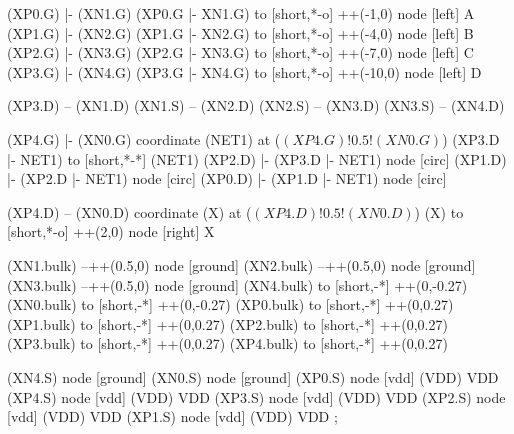 \begin{circuitikz}[american]

	(XP0.G) |- (XN1.G)
	(XP0.G |- XN1.G) to [short,*-o] ++(-1,0) node [left] {A}	
	(XP1.G) |- (XN2.G)
	(XP1.G |- XN2.G) to [short,*-o] ++(-4,0) node [left] {B}
	(XP2.G) |- (XN3.G)
	(XP2.G |- XN3.G) to [short,*-o] ++(-7,0) node [left] {C}
	(XP3.G) |- (XN4.G)
	(XP3.G |- XN4.G) to [short,*-o] ++(-10,0) node [left] {D}
	
	(XP3.D) -- (XN1.D)
	(XN1.S) -- (XN2.D)
	(XN2.S) -- (XN3.D)
	(XN3.S) -- (XN4.D)
	
	(XP4.G) |- (XN0.G)
	coordinate (NET1) at ($(XP4.G)!0.5!(XN0.G)$)
	(XP3.D |- NET1) to [short,*-*] (NET1) 
	(XP2.D) |- (XP3.D |- NET1) node [circ]{}
	(XP1.D) |- (XP2.D |- NET1) node [circ]{}
	(XP0.D) |- (XP1.D |- NET1) node [circ]{}
	
	(XP4.D) -- (XN0.D)
	coordinate (X) at ($(XP4.D)!0.5!(XN0.D)$)
	(X) to [short,*-o] ++(2,0) node [right] {X}
	
	(XN1.bulk) --++(0.5,0) node [ground]{}	
	(XN2.bulk) --++(0.5,0) node [ground]{}
	(XN3.bulk) --++(0.5,0) node [ground]{}
	(XN4.bulk) to [short,-*] ++(0,-0.27)
	(XN0.bulk) to [short,-*] ++(0,-0.27)
	(XP0.bulk) to [short,-*] ++(0,0.27)
	(XP1.bulk) to [short,-*] ++(0,0.27)
	(XP2.bulk) to [short,-*] ++(0,0.27)
	(XP3.bulk) to [short,-*] ++(0,0.27)
	(XP4.bulk) to [short,-*] ++(0,0.27)


	(XN4.S) node [ground] {}
	(XN0.S) node [ground] {}
	(XP0.S) node [vdd] (VDD) {VDD}
	(XP4.S) node [vdd] (VDD) {VDD}
	(XP3.S) node [vdd] (VDD) {VDD}
	(XP2.S) node [vdd] (VDD) {VDD}
	(XP1.S) node [vdd] (VDD) {VDD}
;

\end{circuitikz}
